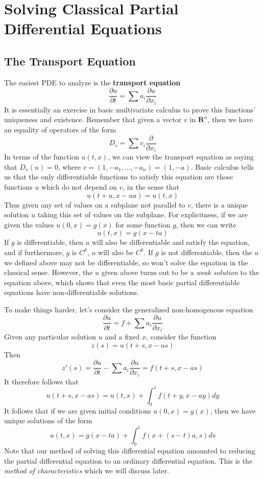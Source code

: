 \chapter{Solving Classical Partial Differential Equations}

\section{The Transport Equation}

The easiest PDE to analyze is the {\bf transport equation}
%
\[ \frac{\partial u}{\partial t} = \sum a_i \frac{\partial u}{\partial x_i} \]
%
It is essentially an exercise in basic multivariate calculus to prove this functions' uniqueness and existence. Remember that given a vector $v$ in $\mathbf{R}^n$, then we have an equality of operators of the form
%
\[ D_v = \sum v_i \frac{\partial}{\partial x_i} \]
%
In terms of the function $u(t,x)$, we can view the transport equation as saying that $D_v(u) = 0$, where $v = (1,-a_1, \dots, -a_n) = (1,-a)$. Basic calculus tells us that the only differentiable functions to satisfy this equation are those functions $u$ which do not depend on $v$, in the sense that
%
\[ u(t + u,x - ua) = u(t,x) \]
%
Thus given any set of values on a subplane not parallel to $v$, there is a unique solution $u$ taking this set of values on the subplane. For explicitness, if we are given the values $u(0,x) = g(x)$ for some function $g$, then we can write
%
\[ u(t,x) = g(x - ta) \]
%
If $g$ is differentiable, then $u$ will also be differentiable and satisfy the equation, and if furthermore, $g$ is $C^k$, $u$ will also be $C^k$. If $g$ is not differentiable, then the $u$ we defined above may not be differentiable, so won't solve the equation in the classical sense. However, the $u$ given above turns out to be a {\it weak solution} to the equation above, which shows that even the most basic partial differentiable equations have non-differentiable solutions.

To make things harder, let's consider the generalized non-homogenous equation
%
\[ \frac{\partial u}{\partial t} = f + \sum a_i \frac{\partial u}{\partial x_i} \]
%
Given any particular solution $u$ and a fixed $x$, consider the function
%
\[ z(s) = u(t + s, x - as) \]
%
Then
%
\[ z'(s) = \frac{\partial u}{\partial t} - \sum a_i \frac{\partial u}{\partial x_i} = f(t + s, x - as) \]
%
It therefore follows that
%
\[ u(t + s, x - as) = u(t,x) + \int_0^s f(t+y,x-ay) dy \]
%
It follows that if we are given initial conditions $u(0,x) = g(x)$, then we have unique solutions of the form
%
\[ u(t,x) = g(x-ta) + \int_0^t f(x + (s-t)a,s) ds \]
%
Note that our method of solving this differential equation amounted to reducing the partial differential equation to an ordinary differential equation. This is the {\it method of characteristics} which we will discuss later.

